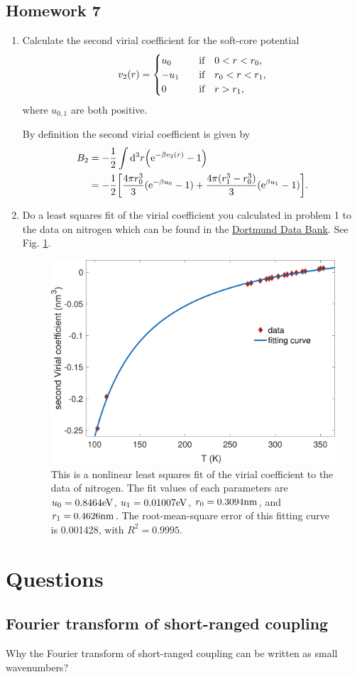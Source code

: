 \documentclass[10pt]{article}
\begin{document}
	\subsection{Homework 7}
	\begin{enumerate}
		\item Calculate the second virial coefficient for the soft-core potential
		\begin{equation}
			v_2(r) =
			\begin{cases}
				u_0 & \qif 0 < r < r_0, \\
				-u_1 & \qif r_0 < r < r_1, \\
				0 & \qif r > r_1,
			\end{cases}
		\end{equation}
		where $u_{0,1}$ are both positive.

		By definition the second virial coefficient is given by
		\begin{align}
			B_2 &= -\frac{1}{2} \int \dd^3 r \qty({\mathrm{e}}^{-\beta v_2(r)} - 1) \\
			&= -\frac{1}{2} \qty[\frac{4\pi r_0^3}{3}({\mathrm{e}}^{-\beta u_0} - 1) + \frac{4\pi (r_1^3 - r_0^3)}{3}({\mathrm{e}}^{\beta u_1} - 1)].
		\end{align}
		\item Do a least squares fit of the virial coefficient you calculated in problem 1 to the data on nitrogen which can be found in the \href{http://www.ddbst.com/en/EED/PCP/BII_C1056.php}{Dortmund Data Bank}. See Fig. \ref{fig: virial fit}.
		\begin{figure}[htbp]
			\centering
			\includegraphics[width=0.7 \textwidth]{figure/virial_fit.pdf}
			\caption{This is a nonlinear least squares fit of the virial coefficient to the data of nitrogen. The fit values of each parameters are $u_0 = 0.8464 {\mathrm{eV}}$, $u_1 = 0.01007 {\mathrm{eV}}$, $r_0 = 0.3094 {\mathrm{nm}}$, and $r_1 = 0.4626 {\mathrm{nm}}$. The root-mean-square error of this fitting curve is 0.001428, with $R^2 = 0.9995$.}
			\label{fig: virial fit}
		\end{figure}
	\end{enumerate}

	\section{Questions}

	\subsection{Fourier transform of short-ranged coupling}
	Why the Fourier transform of short-ranged coupling can be written as small wavenumbers?
\end{document}
